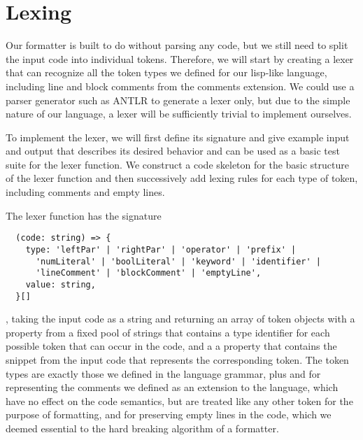 \section{Lexing}
Our formatter is built to do without parsing any code,
but we still need to split the input code into individual tokens.
Therefore, we will start by creating a lexer that can recognize
all the token types we defined for our lisp-like language,
including line and block comments from the comments extension.
We could use a parser generator such as ANTLR to generate a lexer only,
but due to the simple nature of our language,
a lexer will be sufficiently trivial to implement ourselves.

To implement the lexer,
we will first define its signature
and give example input and output
that describes its desired behavior
and can be used as a basic test suite
for the lexer function.
We construct a code skeleton for the
basic structure of the lexer function
and then successively add lexing rules
for each type of token,
including comments and empty lines.

The lexer function has the signature
\begin{verbatim}
  (code: string) => {
    type: 'leftPar' | 'rightPar' | 'operator' | 'prefix' |
      'numLiteral' | 'boolLiteral' | 'keyword' | 'identifier' |
      'lineComment' | 'blockComment' | 'emptyLine',
    value: string,
  }[]
\end{verbatim}
, taking the input code as a string and returning an array of
token objects with a property  from a fixed pool of
strings that contains a type identifier
for each possible token that can occur in the code,
and a a property  that contains the
snippet from the input code that represents the corresponding token.
The token types are exactly those we defined in the language grammar,
plus  and 
for representing the comments we defined as an extension to the language,
which have no effect on the code semantics,
but are treated like any other token for the purpose of formatting,
and  for preserving empty lines in the code,
which we deemed essential to the hard breaking algorithm of a formatter.




















